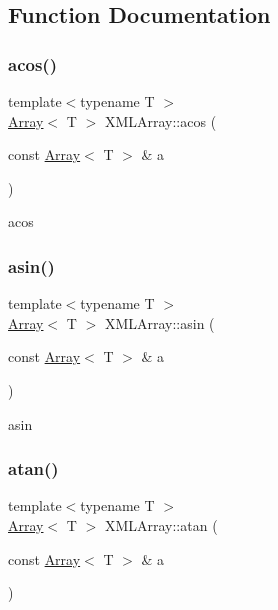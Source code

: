 \subsection{Function Documentation}
\mbox{\label{namespaceXMLArray_a8fa6c5656b58ed00c7cff9fcdf6dbb96}} 
\subsubsection{\texorpdfstring{acos()}{acos()}}
{\footnotesize\ttfamily template$<$typename T $>$ \\
\mbox{\hyperlink{classXMLArray_1_1Array}{Array}}$<$ T $>$ X\+M\+L\+Array\+::acos (\begin{DoxyParamCaption}\item[{const \mbox{\hyperlink{classXMLArray_1_1Array}{Array}}$<$ T $>$ \&}]{a }\end{DoxyParamCaption})\hspace{0.3cm}{\ttfamily [inline]}}



acos 

\mbox{\label{namespaceXMLArray_ad218b241e0898d122bf3c722a16a1741}} 
\subsubsection{\texorpdfstring{asin()}{asin()}}
{\footnotesize\ttfamily template$<$typename T $>$ \\
\mbox{\hyperlink{classXMLArray_1_1Array}{Array}}$<$ T $>$ X\+M\+L\+Array\+::asin (\begin{DoxyParamCaption}\item[{const \mbox{\hyperlink{classXMLArray_1_1Array}{Array}}$<$ T $>$ \&}]{a }\end{DoxyParamCaption})\hspace{0.3cm}{\ttfamily [inline]}}



asin 

\mbox{\label{namespaceXMLArray_a961e9e4f133045c069214c97704aa349}} 
\subsubsection{\texorpdfstring{atan()}{atan()}}
{\footnotesize\ttfamily template$<$typename T $>$ \\
\mbox{\hyperlink{classXMLArray_1_1Array}{Array}}$<$ T $>$ X\+M\+L\+Array\+::atan (\begin{DoxyParamCaption}\item[{const \mbox{\hyperlink{classXMLArray_1_1Array}{Array}}$<$ T $>$ \&}]{a }\end{DoxyParamCaption})\hspace{0.3cm}{\ttfamily [inline]}}



